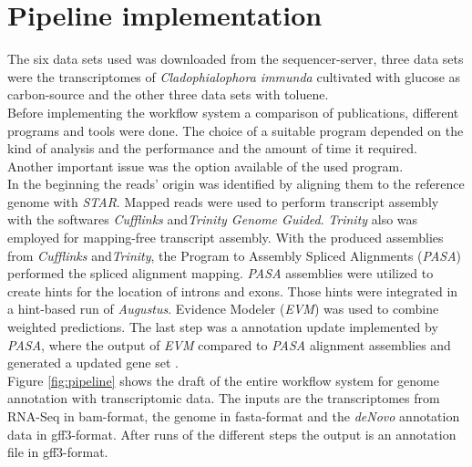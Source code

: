 \documentclass[12pt, a4paper]{report}
\newcommand{\HT}[1]{\textcolor{red}{#1}}
\begin{document}
\section{Pipeline implementation}
The six data sets used was downloaded from the sequencer-server, three data sets %
were the transcriptomes of \textit{Cladophialophora immunda} cultivated with glucose as carbon-source and the other three data sets with toluene. \\
Before implementing the workflow system a comparison of publications, different programs and tools were done. The choice of a suitable program depended on the kind of analysis and the performance and the amount of time it required. Another important issue was the option available of the used program. \\
In the beginning the reads' origin was identified by aligning them to the reference genome with \textit{STAR}. Mapped reads were used to perform transcript assembly with the softwares \textit{Cufflinks} and\textit{Trinity Genome Guided}. \textit{Trinity} also was employed for mapping-free transcript assembly. With the produced assemblies from \textit{Cufflinks} and\textit{Trinity}, the Program to Assembly Spliced Alignments (\textit{PASA}) performed the spliced alignment mapping. \textit{PASA} assemblies were utilized to create hints for the location of introns and exons. Those hints were integrated in a hint-based run of \textit{Augustus}. Evidence Modeler (\textit{EVM}) was used to combine weighted predictions. The last step was a annotation update implemented by \textit{PASA}, where the output of \textit{EVM} compared to \textit{PASA} alignment assemblies and generated a updated gene set \cite{Haas2011, Steijger2013, Linde2015}.  \\
Figure \ref{fig:pipeline} shows the draft of the entire workflow system for genome annotation with transcriptomic data. The inputs are the transcriptomes from RNA-Seq in bam-format, the genome in fasta-format and the \textit{deNovo} annotation data in gff3-format. After runs of the different steps the output is an annotation file in gff3-format.
\end{document}
